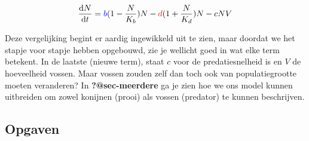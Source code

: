 \documentclass[
  letterpaper,
  DIV=11,
  numbers=noendperiod]{scrartcl}
\theoremstyle{definition}
\theoremstyle{remark}
\begin{document}
\begin{align}
    \frac{\mathrm{d}N}{\mathrm{d}t} &= \color{blue}b\color{black}(1-\frac{N}{K_b})N - \color{red}d\color{black}(1+\frac{N}{K_d})N - cNV\\
\end{align}

Deze vergelijking begint er aardig ingewikkeld uit te zien, maar doordat
we het stapje voor stapje hebben opgebouwd, zie je wellicht goed in wat
elke term betekent. In de laatste (nieuwe term), staat \(c\) voor de
predatiesnelheid is en \(V\) de hoeveelheid vossen. Maar vossen zouden
zelf dan toch ook van populatiegrootte moeten veranderen? In
\textbf{?@sec-meerdere} ga je zien hoe we ons model kunnen uitbreiden om
zowel konijnen (prooi) als vossen (predator) te kunnen beschrijven.

\subsection{Opgaven}\label{opgaven}
\end{document}
